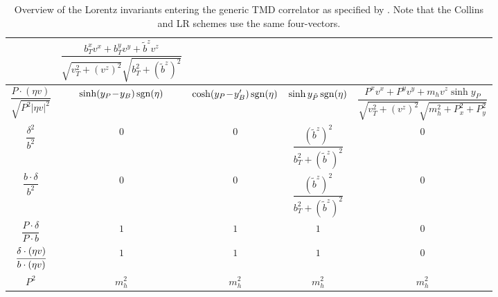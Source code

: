 \documentclass[11pt,a4paper]{article}
\begin{document}
{\begin{table}
\begin{tabular}{|c|c|c|c|c|}
			& $\dfrac{b_T^xv^x + b_T^y v^y + \tilde b^z v^z}{\sqrt{v_T^2 + (v^z)^2}\sqrt{b_T^2 + (\tilde b^z)^2}}$
			\\ \hline
			\cellcolor{RosyBrown3} \phantom{x}\hspace{-0.4cm} $\dfrac{P\cdot (\eta v)}{\sqrt{P^2|\eta v|^2}} $ 
            & $\sinh(y_P\!-\! y_B) \,{\rm sgn}(\eta)$
            & $\cosh(y_P \!-\! y_B')\,{\rm sgn}(\eta)$
            & $\sinh  y_{\tilde P}\,{\rm sgn}(\eta)$
            & $\dfrac{P^xv^x + P^yv^y + m_hv^z\sinh y_P}{\sqrt{v_T^2 + (v^z)^2}\sqrt{m_h^2 + P_x^2+P_y^2}}$
            \\ \hline
			\cellcolor{RosyBrown3} $\dfrac{\delta^2}{b^2}$ & $0$ & $0$ & $\dfrac{(\tilde b^z)^2}{b_T^2 +(\tilde b^z)^2}$ & $0$
			\\ \hline
			\cellcolor{RosyBrown3} $\dfrac{b\cdot \delta}{b^2}$ & $0$ & $0$ & $\dfrac{(\tilde b^z)^2}{b_T^2 +(\tilde b^z)^2}$ & $0$
			\\ \hline
			\cellcolor{RosyBrown3} $\dfrac{P \cdot \delta}{P \cdot b}$ & $1$ & $1$ & $1$ & $0$
			\\ \hline
			\cellcolor{RosyBrown3} $\cfrac{\delta \cdot (\eta v)}{b\cdot (\eta v)}$ & $1$ & $1$ & $1$ & $0$
			\\ \hline
			\cellcolor{RosyBrown3} $P^2$ & $m_h^2$ & $m_h^2$ & $m_h^2$ & $m_h^2$
			\\ \hline
		\end{tabular}
		\caption{Overview of the Lorentz invariants entering the generic TMD correlator as specified by .
            Note that the Collins and LR schemes use the same four-vectors. 
            }
		\label{tbl:Lorentz_invariants}
\end{table}}
\end{document}
